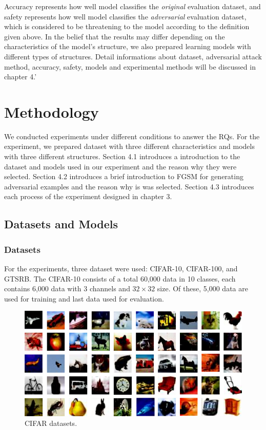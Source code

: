 \documentclass[journal,article,submit,moreauthors,pdftex]{Definitions/mdpi}
\begin{document}
Accuracy represents how well model classifies the {\it original} evaluation dataset, and safety represents how well model classifies the {\it adversarial} evaluation dataset, which is considered to be threatening to the model according to the definition given above.
In the belief that the results may differ depending on the characteristics of the model's structure, we also prepared learning models with different types of structures. 
Detail informations about dataset, adversarial attack method, accuracy, safety, models and experimental methods will be discussed in chapter 4.'

\section{Methodology}

We conducted experiments under different conditions to answer the RQs. For the experiment, we prepared dataset with three different characteristics and models with three different structures.
Section 4.1 introduces a introduction to the dataset and models used in our experiment and the reason why they were selected.
Section 4.2 introduces a brief introduction to FGSM for generating adversarial examples and the reason why is was selected.
Section 4.3 introduces each process of the experiment designed in chapter 3.

\subsection{Datasets and Models}

\subsubsection{Datasets}

For the experiments, three dataset were used: CIFAR-10, CIFAR-100\cite{cifar}, and GTSRB\cite{gtsrb}.
The CIFAR-10 consists of a total 60,000 data in 10 classes, each contains 6,000 data with 3 channels and \begin{math}{32\times 32}\end{math} size.
Of these, 5,000 data are used for training and last data used for evaluation.

\begin{figure}[H] 
\includegraphics[width=13cm]{Definitions/cifar-datasets.png}
\caption{CIFAR datasets.\label{cifar-datasets}}
\end{figure} 
\end{document}
